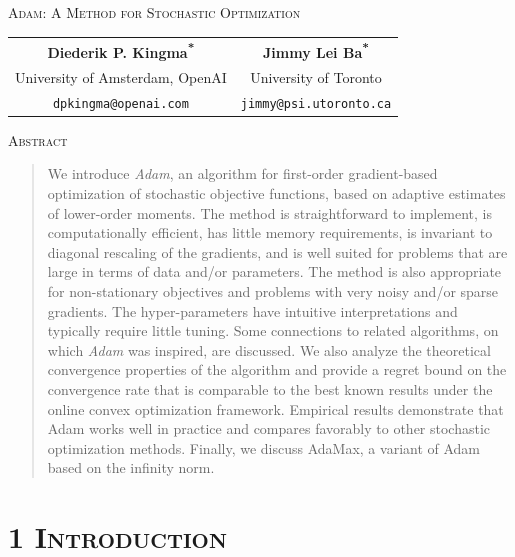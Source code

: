 \documentclass[11pt]{article}
\begin{document}

\begin{center}
{\Large\scshape Adam: A Method for Stochastic Optimization}\\[1.5em]
\begin{tabular}{cc}
\textbf{Diederik P. Kingma\textsuperscript{*}} & \textbf{Jimmy Lei Ba\textsuperscript{*}} \\
University of Amsterdam, OpenAI & University of Toronto \\
\texttt{dpkingma@openai.com} & \texttt{jimmy@psi.utoronto.ca}
\end{tabular}
\end{center}

\vspace{1em}

\begin{center}
{\scshape Abstract}
\end{center}
\begin{quote}
We introduce \emph{Adam}, an algorithm for first-order gradient-based
optimization of stochastic objective functions, based on adaptive
estimates of lower-order moments. The method is straightforward to
implement, is computationally efficient, has little memory
requirements, is invariant to diagonal rescaling of the gradients,
and is well suited for problems that are large in terms of data
and/or parameters. The method is also appropriate for non-stationary
objectives and problems with very noisy and/or sparse gradients. The
hyper-parameters have intuitive interpretations and typically require
little tuning. Some connections to related algorithms, on which
\emph{Adam} was inspired, are discussed. We also analyze the
theoretical convergence properties of the algorithm and provide a
regret bound on the convergence rate that is comparable to the best
known results under the online convex optimization framework.
Empirical results demonstrate that Adam works well in practice and
compares favorably to other stochastic optimization methods. Finally,
we discuss AdaMax, a variant of Adam based on the infinity norm.
\end{quote}

\vspace{1em}

\section*{1 \textsc{Introduction}}
\end{document}

